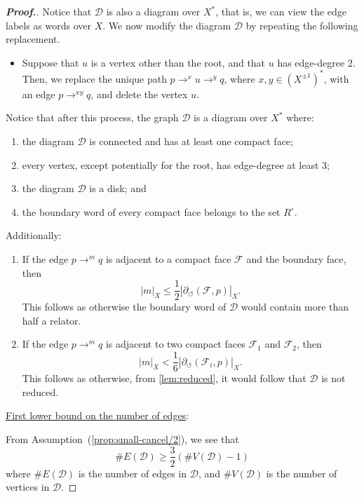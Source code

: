 \documentclass[11pt,a4paper,reqno]{amsart}
\theoremstyle{plain}
\theoremstyle{definition}
\theoremstyle{definition}
\renewcommand\leq\leqslant
\renewcommand\geq\geqslant
\newenvironment{myproof}{\begin{proof}[\normalfont\bfseries Proof.]}{\end{proof}}
\begin{document}
\begin{myproof}
	Notice that $\mathcal D$ is also a diagram over $X^*$, that is, we can view the edge labels as words over $X$.
	We now modify the diagram $\mathcal D$ by repeating the following replacement.
	\begin{itemize}
		\item Suppose that $u$ is a vertex other than the root, and that $u$ has edge-degree 2.
		      Then, we replace the unique path $p \to^x u \to^y q$, where $x,y\in (X^{\pm 1})^*$, with an edge $p \to^{xy} q$, and delete the vertex $u$.
	\end{itemize}
	Notice that after this process, the graph $\mathcal D$ is a diagram over $X^*$ where:
	\begin{enumerate}
		\item\label{prop:small-cancel/1} the diagram $\mathcal D$ is connected and has at least one compact face;
		\item\label{prop:small-cancel/2} every vertex, except potentially for the root, has edge-degree at least 3;
		\item\label{prop:small-cancel/3} the diagram $\mathcal D$ is a disk; and
		\item\label{prop:small-cancel/4} the boundary word of every compact face belongs to the set $R^\circ$.
	\end{enumerate}
	Additionally:
	\begin{enumerate}[label=(\Alph*),ref=\Alph*]
		\item\label{prop:small-cancel/A}
		If the edge $p\to^m q$ is adjacent to a compact face $\mathcal F$ and the boundary face, then \[|m|_X\leq \frac{1}{2}|\partial_\circlearrowleft (\mathcal F, p)|_X.\]
		This follows as otherwise the boundary word of $\mathcal D$ would contain more than half a relator.
		\item\label{prop:small-cancel/B}
		If the edge $p\to^m q$ is adjacent to two compact faces $\mathcal F_1$ and $\mathcal F_2$, then \[|m|_X< \frac{1}{6}|\partial_\circlearrowleft (\mathcal F_i, p)|_X.\]
		This follows as otherwise, from \cref{lem:reduced}, it would follow that $\mathcal D$ is not reduced.
	\end{enumerate}

	\medskip
	\noindent
	\underline{First lower bound on the number of edges}:\nopagebreak

	\smallskip\nopagebreak
	\noindent\nopagebreak
	From Assumption~(\ref{prop:small-cancel/2}), we see that
	\begin{equation}\label{small-cancel/eq1}
		\#E(\mathcal D) \geq \frac{3}{2}\left( \#V(\mathcal D) - 1 \right)
	\end{equation}
	where $\#E(\mathcal D)$ is the number of edges in $\mathcal D$, and $\#V(\mathcal D)$ is the number of vertices in $\mathcal D$.


\end{myproof}
\end{document}
